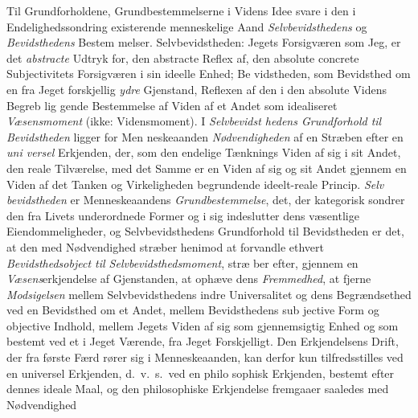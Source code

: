 Til Grundforholdene, Grundbestemmelserne i Videns Idee
svare i den i Endelighedssondring existerende menneskelige
Aand \emph{Selvbevidsthedens} og \emph{Bevidsthedens} Bestem\-%
melser. Selvbevidstheden: Jegets Forsigværen som Jeg, er det
\emph{abstracte} Udtryk for, den abstracte Reflex af, den absolute
concrete Subjectivitets Forsigværen i sin ideelle Enhed; Be\-%
vidstheden, som Bevidsthed om en fra Jeget forskjellig \emph{ydre}
Gjenstand, Reflexen af den i den absolute Videns Begreb lig\-%
gende Bestemmelse af Viden af et Andet som idealiseret
\emph{Væsensmoment} (ikke: Vidensmoment). I \emph{Selvbevidst\-%
hedens Grundforhold til Bevidstheden} ligger for Men\-%
neskeaanden \emph{Nødvendigheden} af en Stræben efter en \emph{uni\-%
versel} Erkjenden, der, som den endelige Tænknings Viden af
sig i sit Andet, den reale Tilværelse, med det Samme er en
Viden af sig og sit Andet gjennem en Viden af det Tanken
og Virkeligheden begrundende ideelt-reale Princip. \emph{Selv\-%
bevidstheden} er Menneskeaandens \emph{Grundbestemmelse},
det, der kategorisk sondrer den fra Livets underordnede Former
og i sig indeslutter dens væsentlige Eiendommeligheder, og
Selvbevidsthedens Grundforhold til Bevidstheden er det, at
den med Nødvendighed stræber henimod at forvandle ethvert
\emph{Bevidsthedsobject til Selvbevidsthedsmoment}, stræ\-%
ber efter, gjennem en \emph{Væsens}erkjendelse af Gjenstanden, at
ophæve dens \emph{Fremmedhed}, at fjerne \emph{Modsigelsen} mellem
Selvbevidsthedens indre Universalitet og dens Begrændsethed
ved en Bevidsthed om et Andet, mellem Bevidsthedens sub\-%
jective Form og objective Indhold, mellem Jegets Viden af sig
som gjennemsigtig Enhed og som bestemt ved et i Jeget
Værende, fra Jeget Forskjelligt. Den Erkjendelsens Drift, der
fra første Færd rører sig i Menneskeaanden, kan derfor kun
tilfredsstilles ved en universel Erkjenden, d.\ v.\ s.\ ved en philo\-%
sophisk Erkjenden, bestemt efter dennes ideale Maal, og den
philosophiske Erkjendelse fremgaaer saaledes med Nødvendighed
